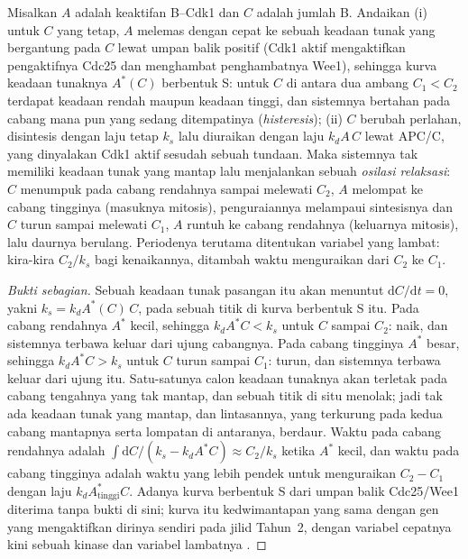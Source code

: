 \begin{theorem}\label{thm:b3:cell-cycle-apoptosis:oscillator}
Misalkan $A$ adalah keaktifan  B--Cdk1 dan $C$ adalah jumlah 
B. Andaikan (i) untuk $C$ yang tetap, $A$ melemas dengan cepat ke sebuah
keadaan tunak yang bergantung pada $C$ lewat umpan balik positif (Cdk1 aktif
mengaktifkan pengaktifnya Cdc25 dan menghambat penghambatnya Wee1), sehingga
kurva keadaan tunaknya $A^{*}(C)$ berbentuk S: untuk $C$ di antara dua
ambang $C_{1} < C_{2}$ terdapat keadaan rendah maupun keadaan tinggi, dan
sistemnya bertahan pada cabang mana pun yang sedang ditempatinya
(\emph{histeresis}); (ii) $C$ berubah perlahan, disintesis dengan laju tetap
$k_{s}$ lalu diuraikan dengan laju $k_{d}A\,C$ lewat APC/C, yang dinyalakan
Cdk1 aktif sesudah sebuah tundaan. Maka sistemnya tak memiliki keadaan tunak
yang mantap lalu menjalankan sebuah \emph{osilasi relaksasi}: $C$ menumpuk
pada cabang rendahnya sampai melewati $C_{2}$, $A$ melompat ke cabang
tingginya (masuknya mitosis), penguraiannya melampaui sintesisnya dan $C$
turun sampai melewati $C_{1}$, $A$ runtuh ke cabang rendahnya (keluarnya
mitosis), lalu daurnya berulang. Periodenya terutama ditentukan variabel yang
lambat: kira-kira $C_{2}/k_{s}$ bagi kenaikannya, ditambah waktu menguraikan
dari $C_{2}$ ke $C_{1}$.
\end{theorem}
\begin{proof}[Bukti sebagian]
Sebuah keadaan tunak pasangan itu akan menuntut $\mathrm{d}C/\mathrm{d}t = 0$,
yakni $k_{s} = k_{d}A^{*}(C)\,C$, pada sebuah titik di kurva berbentuk S itu.
Pada cabang rendahnya $A^{*}$ kecil, sehingga $k_{d}A^{*}C < k_{s}$ untuk $C$
sampai $C_{2}$:  naik, dan sistemnya terbawa keluar dari ujung
cabangnya. Pada cabang tingginya $A^{*}$ besar, sehingga $k_{d}A^{*}C > k_{s}$
untuk $C$ turun sampai $C_{1}$:  turun, dan sistemnya terbawa keluar
dari ujung itu. Satu-satunya calon keadaan tunaknya akan terletak pada cabang
tengahnya yang tak mantap, dan sebuah titik di situ menolak; jadi tak ada
keadaan tunak yang mantap, dan lintasannya, yang terkurung pada kedua cabang
mantapnya serta lompatan di antaranya, berdaur. Waktu pada cabang rendahnya
adalah $\int \mathrm{d}C/(k_{s} - k_{d}A^{*}C) \approx C_{2}/k_{s}$ ketika
$A^{*}$ kecil, dan waktu pada cabang tingginya adalah waktu yang lebih pendek
untuk menguraikan $C_{2} - C_{1}$ dengan laju $k_{d}A^{*}_{\text{tinggi}}C$.
Adanya kurva berbentuk S dari umpan balik Cdc25/Wee1 diterima tanpa bukti di
sini; kurva itu kedwimantapan yang sama dengan gen yang mengaktifkan dirinya
sendiri pada jilid Tahun~2, dengan variabel cepatnya kini sebuah kinase dan
variabel lambatnya .
\end{proof}

